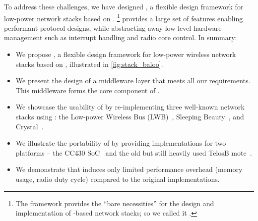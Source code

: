 \pagebreak
To address these challenges, we have designed \baloo, a flexible design framework for low-power network stacks based on \ST.%
\footnote{The framework provides the ``bare necessities'' for the design and implementation of \ST-based network stacks; so we called it \baloo.}
\baloo provides a large set of features enabling performant protocol designs, while abstracting away low-level hardware management such as interrupt handling and radio core control.
In summary:

\begin{itemize}
	\item
	We propose \baloo, a flexible design framework for low-power wireless network stacks based on \ST, illustrated in \cref{fig:stack_baloo}.

	\item
	We present the design of a middleware layer that meets all our requirements. This middleware forms the core component of \baloo.

	\item
	We showcase the usability of \baloo by re-implementing three well-known network stacks using \ST: the Low-power Wireless Bus (LWB)~\cite{ferrari2012LWB}, Sleeping Beauty~\cite{sarkar2016Sleeping}, and Crystal~\cite{istomin2018Interferenceresilient}.

	\item
	We illustrate the portability of \baloo by providing implementations for two platforms -- the CC430 SoC~\cite{CC430F6137} and the old but still heavily used TelosB mote~\cite{TelosB}.

	\item
	We demonstrate that \baloo induces only limited performance overhead (memory usage, radio duty cycle) compared to the original implementations.

\end{itemize}


